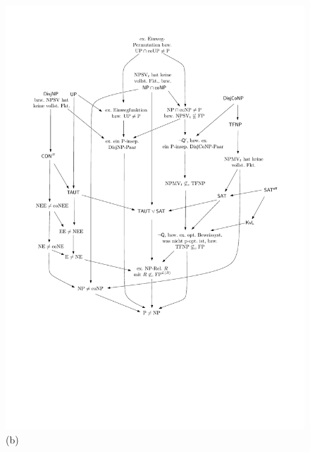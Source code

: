 \begin{figure}[t]
\begin{minipage}[t][8cm][t]{\textwidth}
    \noindent
\begin{minipage}{.3\textwidth}
    \centering\includegraphics[page=4]{figures.pdf}\\\smallskip
    (b)
    \end{minipage}
\begin{minipage}{.3\textwidth}

\end{minipage}
\end{minipage}
\end{figure}
